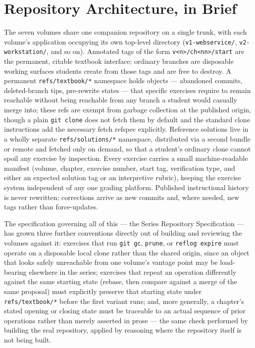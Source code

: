 \documentclass[11pt]{book}
\begin{document}
\section*{Repository Architecture, in Brief}

The seven volumes share one companion repository on a single trunk, with each volume's application occupying its own top-level directory (\texttt{v1-webservice/}, \texttt{v2-workstation/}, and so on). Annotated tags of the form \texttt{v\textless n\textgreater/ch\textless nn\textgreater/start} are the permanent, citable textbook interface; ordinary branches are disposable working surfaces students create from those tags and are free to destroy. A permanent \texttt{refs/textbook/*} namespace holds objects — abandoned commits, deleted-branch tips, pre-rewrite states — that specific exercises require to remain reachable without being reachable from any branch a student would casually merge into; these refs are exempt from garbage collection at the published origin, though a plain \texttt{git clone} does not fetch them by default and the standard clone instructions add the necessary fetch refspec explicitly. Reference solutions live in a wholly separate \texttt{refs/solutions/*} namespace, distributed via a second bundle or remote and fetched only on demand, so that a student's ordinary clone cannot spoil any exercise by inspection. Every exercise carries a small machine-readable manifest (volume, chapter, exercise number, start tag, verification type, and either an expected solution tag or an interpretive rubric), keeping the exercise system independent of any one grading platform. Published instructional history is never rewritten; corrections arrive as new commits and, where needed, new tags rather than force-updates.

The specification governing all of this — the Series Repository Specification — has grown three further conventions directly out of building and reviewing the volumes against it: exercises that run \texttt{git gc}, \texttt{prune}, or \texttt{reflog expire} must operate on a disposable local clone rather than the shared origin, since an object that looks safely unreachable from one volume's vantage point may be load-bearing elsewhere in the series; exercises that repeat an operation differently against the same starting state (rebase, then compare against a merge of the same proposal) must explicitly preserve that starting state under \texttt{refs/textbook/*} before the first variant runs; and, more generally, a chapter's stated opening or closing state must be traceable to an actual sequence of prior operations rather than merely asserted in prose — the same check performed by building the real repository, applied by reasoning where the repository itself is not being built.
\end{document}

